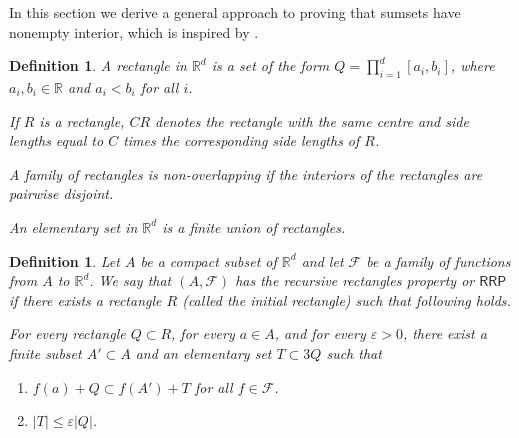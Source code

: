 \documentclass[12pt]{amsart}
\newcommand{\e}{\varepsilon}
\newtheorem{definition}[theorem]{Definition}
\def\R{{\mathbb{R}}}
\newcommand{\RRP}{\mathsf{RRP}}
\numberwithin{theorem}{section}
\numberwithin{equation}{section}
\begin{document}
In this section we derive a general approach to proving that sumsets have nonempty interior, which is inspired by \cite{Talagrand76, EKM81}.
\begin{definition}
    A \emph{rectangle} in $\R^d$ is a set of the form $Q=\prod_{i=1}^d [a_i,b_i]$, where $a_i,b_i\in\R$ and $a_i<b_i$ for all $i$.

    If $R$ is a rectangle, $CR$ denotes the rectangle with the same centre and side lengths equal to $C$ times the corresponding side lengths of $R$.

    A family of rectangles is \emph{non-overlapping} if the interiors of the rectangles are pairwise disjoint.

    An \emph{elementary set} in $\R^d$ is a finite union of rectangles.
\end{definition}

\begin{definition}
    Let $A$ be a compact subset of $\R^d$ and let $\mathcal{F}$ be a family of functions from $A$ to $\R^d$.
    We say that $(A,\mathcal{F})$ has the \emph{recursive rectangles property} or $\RRP$ if there exists a rectangle $R$ (called the initial rectangle) such that following holds.

    For every rectangle $Q\subset R$, for every $a\in A$, and for every $\e>0$, there exist a finite subset $A'\subset A$ and an elementary set $T\subset 3Q$ such that
    \begin{enumerate}[label=\textup{(\roman*)}]
        \item $f(a)+Q\subset f(A')+T$ for all $f\in\mathcal{F}$.
        \item $|T|\le \e |Q|$.
    \end{enumerate}
\end{definition}
\end{document}

